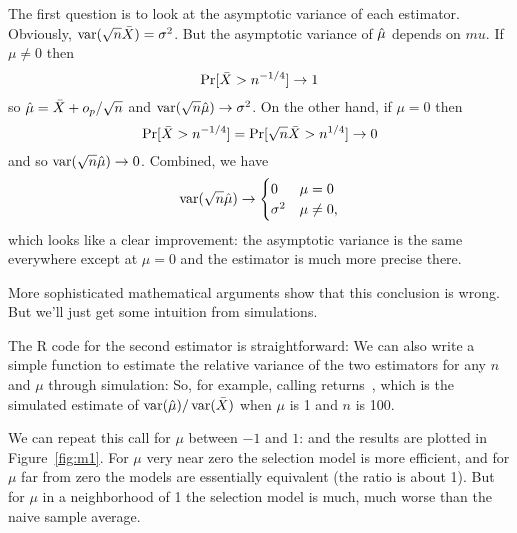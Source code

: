 \begin{itemize}[leftmargin=0pt]
\begin{ex}
    The first question is to look at the asymptotic variance of each
    estimator.  Obviously, $\operatorname{var}(\sqrt{n} \bar{X}) = \sigma^2$.  But the
    asymptotic variance of $\hat{\mu}$ depends on $mu$.  If $\mu \neq 0$
    then
    \begin{equation*}
      \operatorname{Pr}[ \bar{X} > n^{-1/4} ] \to 1
    \end{equation*}
    so $\hat{\mu} = \bar{X} + o_p/\sqrt{n}$ and $\operatorname{var}(\sqrt{n} \hat{\mu}) \to
    \sigma^2$.  On the other hand, if $\mu = 0$ then
    \begin{equation*}
      \operatorname{Pr}[ \bar{X} > n^{-1/4} ] = \operatorname{Pr}[ \sqrt{n} \bar{X} > n^{1/4} ] \to 0
    \end{equation*}
    and so $\operatorname{var}(\sqrt{n} \hat{\mu}) \to 0$.  Combined, we have
    \begin{equation*}
      \operatorname{var}(\sqrt{n} \hat{\mu}) \to
      \begin{cases}
        0        & \mu = 0 \\
        \sigma^2 & \mu \neq 0,
      \end{cases}
    \end{equation*}
    which looks like a clear improvement: the asymptotic variance is
    the same everywhere except at $\mu = 0$ and the estimator is much
    more precise there.

    More sophisticated mathematical arguments show that this
    conclusion is wrong.  But we'll just get some intuition from
    simulations.

    The R code for the second estimator is straightforward:
    \renewcommand*\FancyVerbStartString{## block 1}
    We can also write a simple function to estimate the relative
    variance of the two estimators for any $n$ and $\mu$ through
    simulation:
    \renewcommand*\FancyVerbStartString{## block 2}
    So, for example, calling
    \renewcommand*\FancyVerbStartString{## block 3}
    returns~\exvar, which is the simulated estimate of $\operatorname{var}(\hat{\mu})
    / \operatorname{var}(\bar{X})$ when $\mu$ is 1 and $n$ is 100.

    We can repeat this call for $\mu$ between $-1$ and $1$:
    \renewcommand*\FancyVerbStartString{## block 4}
    and the results are plotted in Figure~\ref{fig:m1}.  For $\mu$
    very near zero the selection model is more efficient, and for
    $\mu$ far from zero the models are essentially equivalent (the
    ratio is about 1).  But for $\mu$ in a neighborhood of 1 the
    selection model is much, much worse than the naive sample average.


\end{ex}
\end{itemize}
